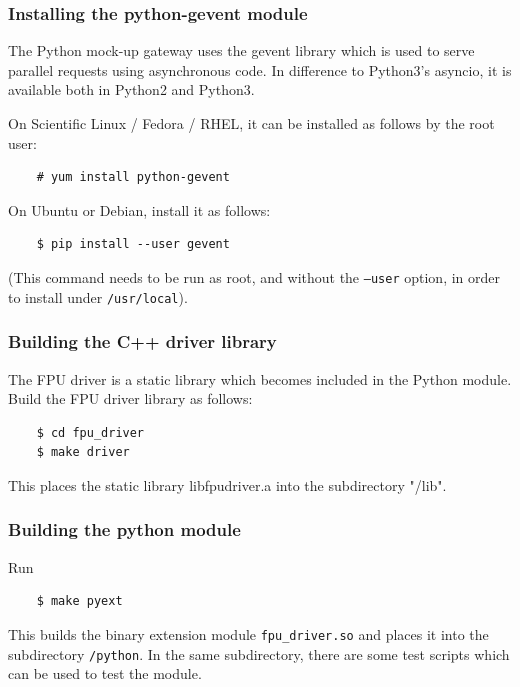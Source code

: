 \documentclass[11pt,a4paper]{report}
\begin{document}
\subsubsection{Installing the python-gevent module}
The Python mock-up gateway uses the gevent
library which is used to serve parallel requests
using asynchronous code. In difference to
Python3's asyncio, it is available both in
Python2 and Python3.

On Scientific Linux / Fedora / RHEL, it can be installed
as follows by the root user:

  \begin{verbatim}
    # yum install python-gevent
  \end{verbatim}    


On Ubuntu or Debian, install it as follows:

  \begin{verbatim}
    $ pip install --user gevent
  \end{verbatim}    

(This command needs to be run as root, and without the \texttt{--user}
  option, in order to install under \texttt{/usr/local}).



\subsubsection{Building the C++ driver library}
The FPU driver is a static library which becomes included in the
Python module.  Build the FPU driver library as follows:

  \begin{verbatim}
    $ cd fpu_driver
    $ make driver
  \end{verbatim}    

This places the static library libfpudriver.a into
the subdirectory "/lib".

\subsubsection{Building the python module}

Run

  \begin{verbatim}
    $ make pyext
  \end{verbatim}    

This builds the binary extension module \verb+fpu_driver.so+
and places it into the subdirectory \verb+/python+.
In the same subdirectory, there are some test
scripts which can be used to test the module.
\end{document}
